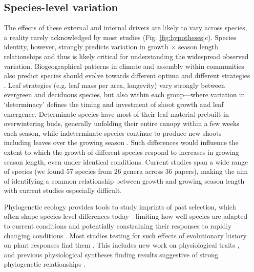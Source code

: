 \documentclass[11pt]{article}
\begin{document}
\subsection*{Species-level variation}
The effects of these external and internal drivers are likely to vary across species, a reality rarely acknowledged by most studies (Fig. \ref{fig:hypotheses}c). Species identity, however, strongly predicts variation in growth $\times$ season length relationships \citep[e.g.][]{cuny2012life,michelot2012comparing} and thus is likely critical for understanding the widespread observed variation. Biogeographical patterns in climate and assembly within communities also predict species should evolve towards different optima and different strategies \citep{Ackerly:2009ly,buckley2012functional}. Leaf strategies (e.g. leaf mass per area, longevity) vary strongly between evergreen and deciduous species, but also within each group---where variation in `determinacy' defines the timing and investment of shoot growth and leaf emergence. Determinate species have most of their leaf material prebuilt in overwintering buds, generally unfolding their entire canopy within a few weeks each season, while indeterminate species continue to produce new shoots including leaves over the growing season \citep{kikuzawa1982leaf,Lechowicz:1984cr}. Such differences would influence the extent to which the growth of different species respond to increases in growing season length, even under identical conditions. Current studies span a wide range of species (we found  57 species from 26 genera across 36 papers), making the aim of identifying a common relationship between growth and growing season length with current studies especially difficult.

Phylogenetic ecology provides tools to study imprints of past selection, which often shape species-level differences today---limiting how well species are adapted to current conditions and potentially constraining their responses to rapidly changing conditions \citep{Ackerly:2009ly}.  %
Most studies testing for such effects of evolutionary history on plant responses find them \citep[e.g.][]{phenophylo}. This includes new work on physiological traits \citep{avila2023evidence}, and previous physiological syntheses finding results suggestive of strong phylogenetic relationships \citep[e.g.][]{way2010differential}.
\end{document}
